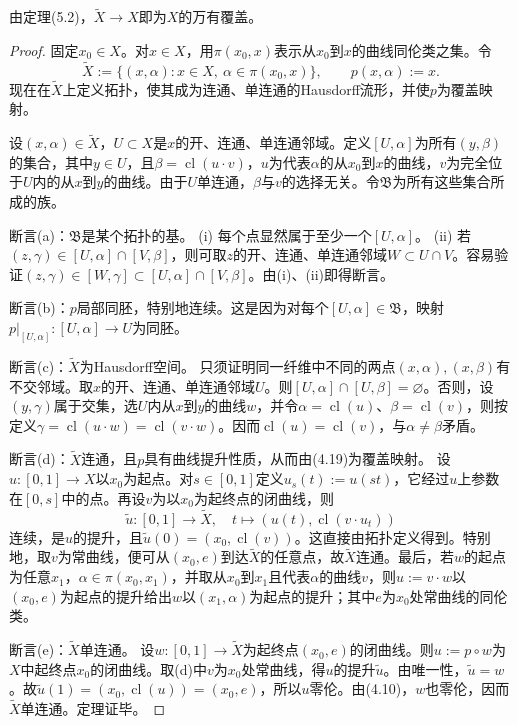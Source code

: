 由定理(5.2)，$\widetilde X\to X$即为$X$的万有覆盖。
\begin{proof}
固定$x_0\in X$。对$x\in X$，用$\pi(x_0,x)$表示从$x_0$到$x$的曲线同伦类之集。令
\[
\widetilde X:=\{(x,\alpha):x\in X,\ \alpha\in\pi(x_0,x)\},\qquad p(x,\alpha):=x.
\]
现在在$\widetilde X$上定义拓扑，使其成为连通、单连通的Hausdorff流形，并使$p$为覆盖映射。

设$(x,\alpha)\in\widetilde X$，$U\subset X$是$x$的开、连通、单连通邻域。定义$[U,\alpha]$为所有$(y,\beta)$的集合，其中$y\in U$，且$\beta=\operatorname{cl}(u\cdot v)$，$u$为代表$\alpha$的从$x_0$到$x$的曲线，$v$为完全位于$U$内的从$x$到$y$的曲线。由于$U$单连通，$\beta$与$v$的选择无关。令$\mathfrak B$为所有这些集合所成的族。

断言(a)：$\mathfrak B$是某个拓扑的基。
(i) 每个点显然属于至少一个$[U,\alpha]$。
(ii) 若$(z,\gamma)\in[U,\alpha]\cap[V,\beta]$，则可取$z$的开、连通、单连通邻域$W\subset U\cap V$。容易验证$(z,\gamma)\in[W,\gamma]\subset[U,\alpha]\cap[V,\beta]$。由(i)、(ii)即得断言。

断言(b)：$p$局部同胚，特别地连续。这是因为对每个$[U,\alpha]\in\mathfrak B$，映射$p|_{[U,\alpha]}:[U,\alpha]\to U$为同胚。

断言(c)：$\widetilde X$为Hausdorff空间。
只须证明同一纤维中不同的两点$(x,\alpha),(x,\beta)$有不交邻域。取$x$的开、连通、单连通邻域$U$。则$[U,\alpha]\cap[U,\beta]=\varnothing$。否则，设$(y,\gamma)$属于交集，选$U$内从$x$到$y$的曲线$w$，并令$\alpha=\operatorname{cl}(u)$、$\beta=\operatorname{cl}(v)$，则按定义$\gamma=\operatorname{cl}(u\cdot w)=\operatorname{cl}(v\cdot w)$。因而$\operatorname{cl}(u)=\operatorname{cl}(v)$，与$\alpha\ne\beta$矛盾。

断言(d)：$\widetilde X$连通，且$p$具有曲线提升性质，从而由(4.19)为覆盖映射。
设$u:[0,1]\to X$以$x_0$为起点。对$s\in[0,1]$定义$u_s(t):=u(st)$，它经过$u$上参数在$[0,s]$中的点。再设$v$为以$x_0$为起终点的闭曲线，则
\[
\widetilde u:[0,1]\to\widetilde X,\quad t\mapsto(u(t),\operatorname{cl}(v\cdot u_t))
\]
连续，是$u$的提升，且$\widetilde u(0)=(x_0,\operatorname{cl}(v))$。这直接由拓扑定义得到。特别地，取$v$为常曲线，便可从$(x_0,e)$到达$\widetilde X$的任意点，故$\widetilde X$连通。最后，若$w$的起点为任意$x_1$，$\alpha\in\pi(x_0,x_1)$，并取从$x_0$到$x_1$且代表$\alpha$的曲线$v$，则$u:=v\cdot w$以$(x_0,e)$为起点的提升给出$w$以$(x_1,\alpha)$为起点的提升；其中$e$为$x_0$处常曲线的同伦类。

断言(e)：$\widetilde X$单连通。
设$w:[0,1]\to\widetilde X$为起终点$(x_0,e)$的闭曲线。则$u:=p\circ w$为$X$中起终点$x_0$的闭曲线。取(d)中$v$为$x_0$处常曲线，得$u$的提升$\widetilde u$。由唯一性，$\widetilde u=w$。故$\widetilde u(1)=(x_0,\operatorname{cl}(u))=(x_0,e)$，所以$u$零伦。由(4.10)，$w$也零伦，因而$\widetilde X$单连通。定理证毕。
\end{proof}
